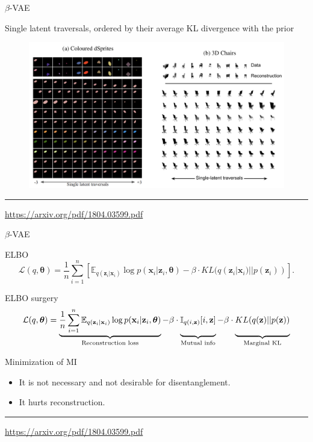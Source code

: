 \documentclass{beamer}
\newcommand{\bx}{\mathbf{x}}
\newcommand{\bz}{\mathbf{z}}
\newcommand{\btheta}{\boldsymbol{\theta}}
\begin{document}
\begin{frame}{$\beta$-VAE}
	\begin{block}{Single latent traversals, ordered by their average KL divergence with the prior}
		\begin{figure}
		\centering
		\includegraphics[width=\linewidth]{figs/betaVAE_9.png}
	\end{figure}
	\end{block}
\vfill
\hrule\medskip
{\scriptsize \href{https://arxiv.org/pdf/1804.03599.pdf}{https://arxiv.org/pdf/1804.03599.pdf}}
\end{frame}
\begin{frame}{$\beta$-VAE}
	\begin{block}{ELBO}
		\vspace{-0.3cm}
		\[
		\mathcal{L}(q, \btheta) = \frac{1}{n} \sum_{i=1}^n \left[ \mathbb{E}_{q(\bz_i | \bx_i)} \log p(\bx_i | \bz_i, \btheta) - \beta \cdot KL(q(\bz_i | \bx_i) || p(\bz_i)) \right].
		\]
		\vspace{-0.3cm}
	\end{block}
	\begin{block}{ELBO surgery}
		\vspace{-0.3cm}
		{\footnotesize
			\[
			\mathcal{L}(q, \btheta) = \underbrace{\frac{1}{n} \sum_{i=1}^n \mathbb{E}_{q(\bz_i | \bx_i)} \log p(\bx_i | \bz_i, \btheta)}_{\text{Reconstruction loss}} - \beta \cdot \underbrace{\mathbb{I}_{q(i, \bz)} [i, \bz]\vphantom{\sum_{i=1}}}_{\text{Mutual info}} - \beta \cdot \underbrace{KL(q(\bz) || p(\bz))\vphantom{\sum_{i=1}}}_{\text{Marginal KL}}
			\]}
	\end{block}
	\begin{block}{Minimization of MI}
	\begin{itemize}
		\item It is not necessary and not desirable for disentanglement. 
		\item It hurts reconstruction.
	\end{itemize}
	\end{block}
	\vfill
	\hrule\medskip
	{\scriptsize \href{https://arxiv.org/pdf/1804.03599.pdf}{https://arxiv.org/pdf/1804.03599.pdf}}
\end{frame}
\end{document}
